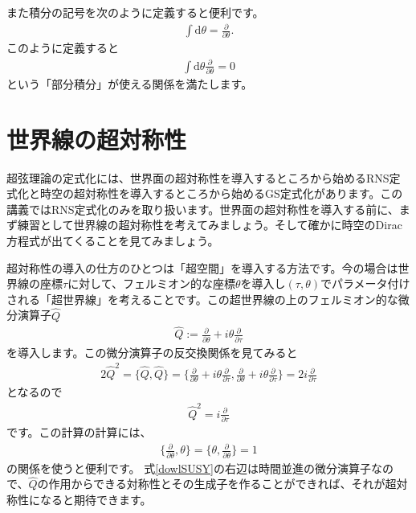 \documentclass[report,paper=a4, fontsize=12pt, line_length=16cm, number_of_lines=34,dvipdfmx]{jlreq}
\numberwithin{equation}{chapter}
\numberwithin{equation}{section}
\newcommand{\del}{\partial}
\newcommand{\deldel}[2]{\frac{\del {#1}}{\del {#2}}}
\newcommand{\Qh}{\widehat{Q}}
\newcommand{\di}{\mathrm{d}}
\begin{document}
また積分の記号を次のように定義すると便利です。
\begin{align}
\int \di \theta =\deldel{}{\theta}.
\end{align}
このように定義すると
\begin{align}
\int \di \theta\deldel{}{\theta}=0
\end{align}
という「部分積分」が使える関係を満たします。

\section{世界線の超対称性}
超弦理論の定式化には、世界面の超対称性を導入するところから始めるRNS定式化と時空の超対称性を導入するところから始めるGS定式化があります。この講義ではRNS定式化のみを取り扱います。世界面の超対称性を導入する前に、まず練習として世界線の超対称性を考えてみましょう。そして確かに時空のDirac方程式が出てくることを見てみましょう。

超対称性の導入の仕方のひとつは「超空間」を導入する方法です。今の場合は世界線の座標$\tau$に対して、フェルミオン的な座標$\theta$を導入し$(\tau,\theta)$でパラメータ付けされる「超世界線」を考えることです。この超世界線の上のフェルミオン的な微分演算子$\Qh$
\begin{align}
\Qh := \deldel{}{\theta} + i \theta \deldel{}{\tau}
\end{align}
を導入します。この微分演算子の反交換関係を見てみると
\begin{align}
2\Qh^2=\{\Qh,\Qh\}=\{\deldel{}{\theta} + i \theta \deldel{}{\tau},\deldel{}{\theta} + i \theta \deldel{}{\tau}\}=2i\deldel{}{\tau}
\end{align}
となるので
\begin{align}
\Qh^2=i\deldel{}{\tau}\label{dowlSUSY}
\end{align}
です。この計算の計算には、
\begin{align}
\{\deldel{}{\theta},\theta\}=\{\theta,\deldel{}{\theta}\}=1
\end{align}
の関係を使うと便利です。
式\eqref{dowlSUSY}の右辺は時間並進の微分演算子なので、$\Qh$の作用からできる対称性とその生成子を作ることができれば、それが超対称性になると期待できます。
\end{document}

